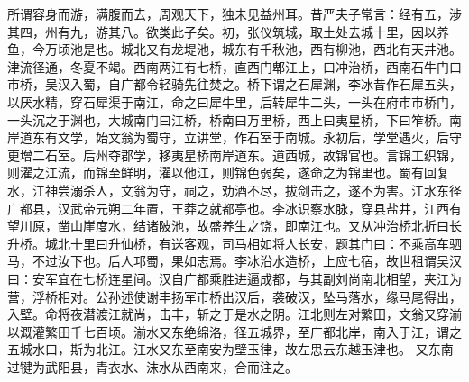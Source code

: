 \documentclass[12pt,UTF8]{ctexbook}
\begin{document}
所谓容身而游，满腹而去，周观天下，独未见益州耳。昔严夫子常言：经有五，涉其四，州有九，游其八。欲类此子矣。初，张仪筑城，取土处去城十里，因以养鱼，今万顷池是也。城北又有龙堤池，城东有千秋池，西有柳池，西北有天井池。津流径通，冬夏不竭。西南两江有七桥，直西门郫江上，曰冲治桥，西南石牛门曰市桥，吴汉入蜀，自广都令轻骑先往焚之。桥下谓之石犀渊，李冰昔作石犀五头，以厌水精，穿石犀渠于南江，命之曰犀牛里，后转犀牛二头，一头在府市市桥门，一头沉之于渊也，大城南门曰江桥，桥南曰万里桥，西上曰夷星桥，下曰笮桥。南岸道东有文学，始文翁为蜀守，立讲堂，作石室于南城。永初后，学堂遇火，后守更增二石室。后州夺郡学，移夷星桥南岸道东。道西城，故锦官也。言锦工织锦，则濯之江流，而锦至鲜明，濯以他江，则锦色弱矣，遂命之为锦里也。蜀有回复水，江神尝溺杀人，文翁为守，祠之，劝酒不尽，拔剑击之，遂不为害。江水东径广都县，汉武帝元朔二年置，王莽之就都亭也。李冰识察水脉，穿县盐井，江西有望川原，凿山崖度水，结诸陂池，故盛养生之饶，即南江也。又从冲治桥北折曰长升桥。城北十里曰升仙桥，有送客观，司马相如将人长安，题其门曰：不乘高车驷马，不过汝下也。后人邛蜀，果如志焉。李冰沿水造桥，上应七宿，故世租谓吴汉曰：安军宜在七桥连星间。汉自广都乘胜进逼成都，与其副刘尚南北相望，夹江为营，浮桥相对。公孙述使谢丰扬军市桥出汉后，袭破汉，坠马落水，缘马尾得出，入壁。命将夜潜渡江就尚，击丰，斩之于是水之阴。江北则左对繁田，文翁又穿湔以溉灌繁田千七百顷。湔水又东绝绵洛，径五城界，至广都北岸，南入于江，谓之五城水口，斯为北江。江水又东至南安为壁玉律，故左思云东越玉津也。
又东南过犍为武阳县，青衣水、沫水从西南来，合而注之。
\end{document}
